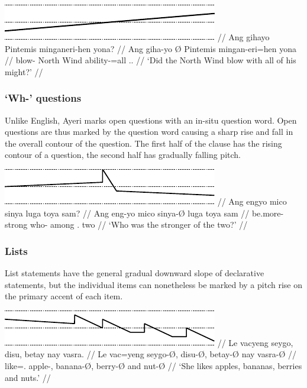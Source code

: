 \ex[belowexskip=0em]\begingl
	\glpreamble \raisebox{-1.5em}
		{\includegraphics{images/contours-ynquestion.pdf}} //
	\gla Ang gihayo {} Pintemis minganeri-hen yona? //
	\glb Ang giha-yo Ø Pintemis mingan-eri=hen yona //
	\glc \AgtT{} blow-\TsgN{} \Top{} {North Wind} ability-\Ins{}=all
		\TsgN{}.\Gen{}. //
	\glft `Did the North Wind blow with all of his might?' //
\endgl\xe

\subsubsection{`Wh-' questions}

Unlike English, Ayeri marks open questions with an in-situ question word.
Open questions are thus marked by the question word causing a sharp rise and 
fall in the overall contour of the question. The first half of the clause has 
the rising contour of a question, the second half has gradually falling pitch.

\ex[belowexskip=0em]\begingl
	\glpreamble \raisebox{-1.5em}
		{\includegraphics{images/contours-whquestion.pdf}} //
	\gla Ang engyo mico sinya luga toya sam? //
	\glb Ang eng-yo mico sinya-Ø luga toya sam //
	\glc \AgtT{} be.more-\TsgN{} strong who-\Top{} among \TplN{}.\Loc{}
		two //
	\glft `Who was the stronger of the two?' //
\endgl\xe

\subsubsection{Lists}

List statements have the general gradual downward slope of 
declarative statements, but the individual items can nonetheless be marked by a 
pitch rise on the primary accent of each item.

\ex[belowexskip=0em]\begingl
	\glpreamble \raisebox{-1.5em}
		{\includegraphics{images/contours-list.pdf}} //
	\gla Le vacyeng seygo, disu, betay nay vasra. //
	\glb Le vac=yeng seygo-Ø, disu-Ø, betay-Ø nay vasra-Ø //
	\glc \PatTI{} like=\TsgF{}.\Aarg{} apple-\Top{}, banana-Ø, berry-Ø and
		nut-Ø //
	\glft `She likes apples, bananas, berries and nuts.' //
\endgl\xe

